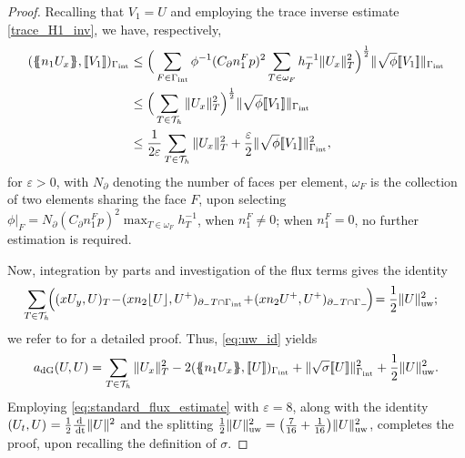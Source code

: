 \documentclass{amsart}
\newcommand{\norm}[2]{\|{#1}\|_{{#2}}}
\newcommand{\jump}[1]{[\kern-0.6mm [{#1}]\kern-0.6mm]}
\newcommand{\av}[1]{\{\kern-1.2mm \{{#1}\}\kern-1.2mm\}}
\newcommand{\dee}{{\rm d}}
\newcommand{\su}{\sum_{T \in \Th}}
\newcommand{\inner}[3]{({#1},{#2})_{{#3}}}
\newcommand{\Th}{\mathcal{T}_h}
\newcommand{\gint}{\Gamma_{\rm int}}
\newcommand{\gif}{\Gamma_-}
\newcommand{\cinvT}{C_{\partial}}
\newcommand{\normal}{{n}}
\newcommand{\jumpu}[1]{ \lfloor #1 \rfloor }
\newcommand{\avg }[1]{ \av{ #1}}
\newcommand{\dt}{\,{\rm dt}}
\theoremstyle{definition}
\theoremstyle{remark}
\numberwithin{equation}{section}
\begin{document}
\begin{proof}
 {Recalling that $V_1=U$ and employing} the trace inverse estimate \eqref{trace_H1_inv},  we have,  {respectively,} %
\begin{equation}\label{eq:standard_flux_estimate}
\begin{aligned}
 \inner{\avg{\normal_1 U_x}}{\jump{V_1}}{\gint }
 &\leq  \Big(\sum_{F\in \gint } \phi^{-1}(\cinvT n_1^Fp)^2 \sum_{T\in\omega_F}   h_T^{-1} \norm{  U_x}{ T}^2\Big)^{\frac{1}{2}} \norm{\sqrt{\phi} \jump{V_1}}{\gint} \\
 &\leq  \Big(\su  \norm{  U_x}{ T}^2 \Big)^{\frac{1}{2}} \norm{\sqrt{\phi} \jump{V_1}}{\gint} \\
&\leq \frac{1}{2\varepsilon}  \su \norm{ U_x}{ T}^2 +  \frac{\varepsilon}{2}\norm{\sqrt{\phi} \jump{V_1}}{\gint}^2,
\end{aligned}
\end{equation}
for $\varepsilon>0$, with $N_{\partial}$ denoting the number of faces per element,  $\omega_F$  is the collection of two elements sharing the face $F$, upon selecting $\phi|_F = N_{\partial}(\cinvT n_1^Fp)^2\max_{T\in \omega_F}h_T^{-1} $, when $n_1^F\neq 0$; when   $n_1^F=0$, no further estimation is required.

Now, integration by parts and investigation of the flux terms gives the identity
 \begin{equation}\label{eq:uw_id}
 	\begin{split}
		&\sum_{T \in \Th} \!\! \Big(\inner{x U_y}{U}{T}
		\!-\!
		\inner{x\normal_2 \jumpu{U}}{U^+}{\partial_- T \cap \gint}
	\!	+\!
		\inner{x\normal_2 U^+ }{ U^+ }{\partial_- T \cap \gif} \!\Big)\! = \frac{1}{2}\norm{U}{\rm uw}^2;
\end{split}\end{equation}
we refer to \cite[Lemma 2.4]{houston_schwab_suli_stabilised} for a detailed proof. Thus,  \eqref{eq:uw_id} yields
\[
\begin{split}
   a_{\rm dG}(U,U)
=
    \sum_{T \in \Th} \norm{U_x}{T}^2
    -
    2 \inner{\avg{\normal_1 U_x}}{\jump{U}}{\gint}
    +
    \norm{\sqrt{\sigma} \jump{U}}{\gint}^2
    +
\frac{1}{2}\norm{U}{\rm uw}^2.
\end{split}
\]
Employing \eqref{eq:standard_flux_estimate} with $\varepsilon=8$, along with the identity $ \inner{U_t}{U}{} =
\frac{1}{2}\frac{\dee}{\dt} \norm{U}{}^2$  and the splitting $\frac{1}{2}\norm{U}{\rm uw}^2=\big(\frac{7}{16}+\frac{1}{16}\big)\norm{U}{\rm uw}^2$, completes the proof,  {upon recalling the definition of $\sigma$.}
\end{proof}
\end{document}
